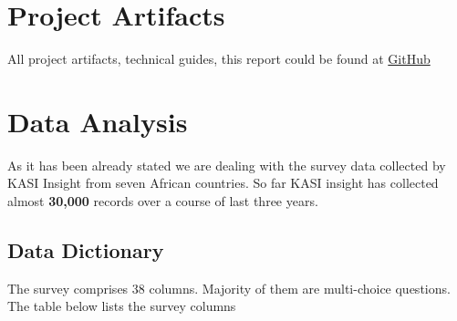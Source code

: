 \hypertarget{project-artifacts}{%
\section{Project Artifacts}\label{project-artifacts}}

All project artifacts, technical guides, this report could be found at
\href{https://github.com/v2msLabs/ML1030-Capstone-Project}{GitHub}

\hypertarget{data-analysis}{%
\section{Data Analysis}\label{data-analysis}}

As it has been already stated we are dealing with the survey data
collected by KASI Insight from seven African countries. So far KASI
insight has collected almost \textbf{30,000} records over a course of
last three years.

\hypertarget{data-dictionary}{%
\subsection{Data Dictionary}\label{data-dictionary}}

The survey comprises 38 columns. Majority of them are multi-choice
questions. The table below lists the survey columns

